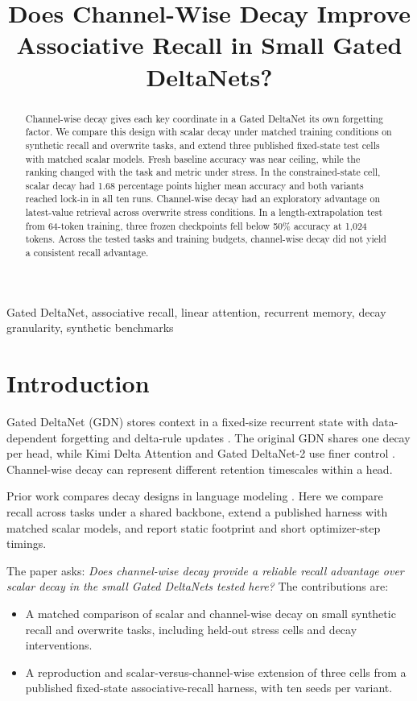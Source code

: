 \documentclass[conference]{IEEEtran}
\title{Does Channel-Wise Decay Improve Associative Recall in Small Gated DeltaNets?}
\author{\IEEEauthorblockN{Mayank Mehta, Michelle Aloz, Amrita Pati, and Sujata Deshmukh}
\IEEEauthorblockA{Department of Computer Engineering\\
Fr. Conceicao Rodrigues College of Engineering\\
Mumbai, India}}
\begin{document}
\maketitle

\begin{abstract}
Channel-wise decay gives each key coordinate in a Gated DeltaNet its own forgetting factor. We compare this design with scalar decay under matched training conditions on synthetic recall and overwrite tasks, and extend three published fixed-state test cells with matched scalar models. Fresh baseline accuracy was near ceiling, while the ranking changed with the task and metric under stress. In the constrained-state cell, scalar decay had 1.68 percentage points higher mean accuracy and both variants reached lock-in in all ten runs. Channel-wise decay had an exploratory advantage on latest-value retrieval across overwrite stress conditions. In a length-extrapolation test from 64-token training, three frozen checkpoints fell below 50\% accuracy at 1,024 tokens. Across the tested tasks and training budgets, channel-wise decay did not yield a consistent recall advantage.
\end{abstract}

\begin{IEEEkeywords}
Gated DeltaNet, associative recall, linear attention, recurrent memory, decay granularity, synthetic benchmarks
\end{IEEEkeywords}

\section{Introduction}
Gated DeltaNet (GDN) stores context in a fixed-size recurrent state with data-dependent forgetting and delta-rule updates \cite{yang2025gdn}. The original GDN shares one decay per head, while Kimi Delta Attention and Gated DeltaNet-2 use finer control \cite{kimi2025,hatamizadeh2026gdn2}. Channel-wise decay can represent different retention timescales within a head.

Prior work compares decay designs in language modeling \cite{das2026}. Here we compare recall across tasks under a shared backbone, extend a published harness with matched scalar models, and report static footprint and short optimizer-step timings.

The paper asks: \emph{Does channel-wise decay provide a reliable recall advantage over scalar decay in the small Gated DeltaNets tested here?} The contributions are:
\begin{itemize}
  \item A matched comparison of scalar and channel-wise decay on small synthetic recall and overwrite tasks, including held-out stress cells and decay interventions.
  \item A reproduction and scalar-versus-channel-wise extension of three cells from a published fixed-state associative-recall harness, with ten seeds per variant.
\end{itemize}
\end{document}
